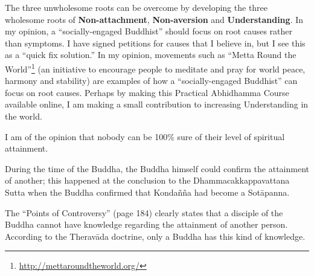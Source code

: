 The three unwholesome roots can be overcome by developing the three wholesome roots of \textbf{Non-attachment}, \textbf{Non-aversion} and \textbf{Understanding}. In my opinion, a “socially-engaged Buddhist” should focus on root causes rather than symptoms. I have signed petitions for causes that I believe in, but I see this as a “quick fix solution.” In my opinion, movements such as “Metta Round the World”\footnote{\url{http://mettaroundtheworld.org/}} (an initiative to encourage people to meditate and pray for world peace, harmony and stability) are examples of how a “socially-engaged Buddhist” can focus on root causes. Perhaps by making this Practical Abhidhamma Course available online, I am making a small contribution to increasing Understanding in the world. \smiley


I am of the opinion that nobody can be 100\% sure of their level of spiritual attainment. 

During the time of the Buddha, the Buddha himself could confirm the attainment of another; this happened at the conclusion to the Dhammacakkappavattana Sutta when the Buddha confirmed that Kondañña had become a Sotāpanna.

The “Points of Controversy” (page 184) clearly states that a disciple of the Buddha cannot have knowledge regarding the attainment of another person. According to the Theravāda doctrine, only a Buddha has this kind of knowledge.

